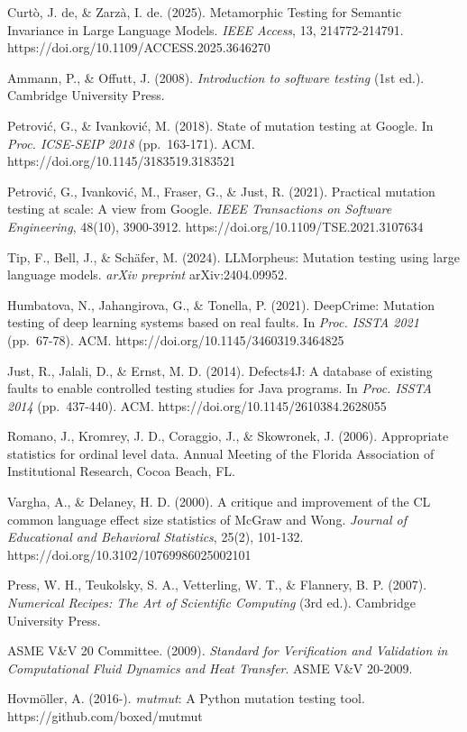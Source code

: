 \documentclass[review,12pt,authoryear]{elsarticle}
\begin{document}
Curtò, J. de, \& Zarzà, I. de. (2025). Metamorphic Testing for Semantic
Invariance in Large Language Models. \emph{IEEE Access}, 13,
214772-214791. https://doi.org/10.1109/ACCESS.2025.3646270

Ammann, P., \& Offutt, J. (2008). \emph{Introduction to software
testing} (1st ed.). Cambridge University Press.

Petrović, G., \& Ivanković, M. (2018). State of mutation testing at
Google. In \emph{Proc. ICSE-SEIP 2018} (pp.~163-171). ACM.
https://doi.org/10.1145/3183519.3183521

Petrović, G., Ivanković, M., Fraser, G., \& Just, R. (2021). Practical
mutation testing at scale: A view from Google. \emph{IEEE Transactions
on Software Engineering}, 48(10), 3900-3912.
https://doi.org/10.1109/TSE.2021.3107634

Tip, F., Bell, J., \& Schäfer, M. (2024). LLMorpheus: Mutation testing
using large language models. \emph{arXiv preprint} arXiv:2404.09952.

Humbatova, N., Jahangirova, G., \& Tonella, P. (2021). DeepCrime:
Mutation testing of deep learning systems based on real faults. In
\emph{Proc. ISSTA 2021} (pp.~67-78). ACM.
https://doi.org/10.1145/3460319.3464825

Just, R., Jalali, D., \& Ernst, M. D. (2014). Defects4J: A database of
existing faults to enable controlled testing studies for Java programs.
In \emph{Proc. ISSTA 2014} (pp.~437-440). ACM.
https://doi.org/10.1145/2610384.2628055

Romano, J., Kromrey, J. D., Coraggio, J., \& Skowronek, J. (2006).
Appropriate statistics for ordinal level data. Annual Meeting of the
Florida Association of Institutional Research, Cocoa Beach, FL.

Vargha, A., \& Delaney, H. D. (2000). A critique and improvement of the
CL common language effect size statistics of McGraw and Wong.
\emph{Journal of Educational and Behavioral Statistics}, 25(2), 101-132.
https://doi.org/10.3102/10769986025002101

Press, W. H., Teukolsky, S. A., Vetterling, W. T., \& Flannery, B. P.
(2007). \emph{Numerical Recipes: The Art of Scientific Computing} (3rd
ed.). Cambridge University Press.

ASME V\&V 20 Committee. (2009). \emph{Standard for Verification and
Validation in Computational Fluid Dynamics and Heat Transfer}. ASME V\&V
20-2009.

Hovmöller, A. (2016-). \emph{mutmut}: A Python mutation testing tool.
https://github.com/boxed/mutmut
\end{document}
